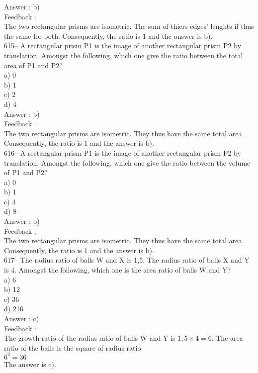 \documentclass[letterpaper, 12pt]{article}
\begin{document}
Answer : b)\\

Feedback : \\
The two rectangular prisms are isometric. The sum of thiers edges' lenghts if thus the same for both. Consequently, the ratio is 1 and the answer is b).\\

615-- A rectangular prism P1 is the image of another rectangular prism P2 by translation.  Amongst the following, which one give the ratio between the total area of P1 and P2?\\
a) 0\\
b) 1\\
c) 2\\
d) 4\\

Answer : b)\\

Feedback : \\
The two rectangular prisms are isometric. They thus have the same total area. Consequently, the ratio is 1 and the answer is b).\\

616-- A rectangular prism P1 is the image of another rectangular prism P2 by translation.  Amongst the following, which one give the ratio between the volume of P1 and P2?\\
a) 0\\
b) 1\\
c) 4\\
d) 8\\

Answer : b)\\

Feedback : \\
The two rectangular prisms are isometric. They thus have the same total area. Consequently, the ratio is 1 and the answer is b).\\

617-- The radius ratio of balls W and X is 1,5. The radius ratio of balls X and Y is 4. Amongst the following, which one is the area ratio of balls W and Y?\\
a) 6\\
b) 12\\
c) 36\\
d) 216\\

Answer : c)\\

Feedback : \\
The growth ratio of the radius ratio of balls W and Y is $1,5\times4=6$. The area ratio of the balls is the square of radius ratio.\\
$6^{2}=36$\\
The answer is c).\\
\end{document}
